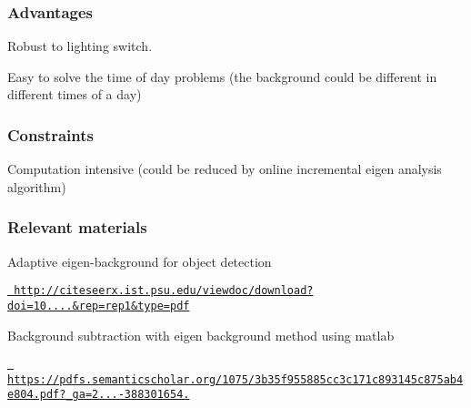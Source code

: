 \subsubsection*{Advantages}

Robust to lighting switch.

Easy to solve the time of day problems (the background could be different in different times of a day)

\subsubsection*{Constraints}

Computation intensive (could be reduced by online incremental eigen analysis algorithm)

\subsubsection*{Relevant materials}

Adaptive eigen-\/background for object detection

\href{http://citeseerx.ist.psu.edu/viewdoc/download?doi=10.1.1.99.4948&rep=rep1&type=pdf}{\texttt{ http\+://citeseerx.\+ist.\+psu.\+edu/viewdoc/download?doi=10....\&rep=rep1\&type=pdf}}

Background subtraction with eigen background method using matlab

\href{https://pdfs.semanticscholar.org/1075/3b35f955885cc3c171c893145c875ab4e804.pdf?_ga=2.85050078.654736628.1596722918-388301654.1594697158}{\texttt{ https\+://pdfs.\+semanticscholar.\+org/1075/3b35f955885cc3c171c893145c875ab4e804.\+pdf?\+\_\+ga=2...-\/388301654.}} 